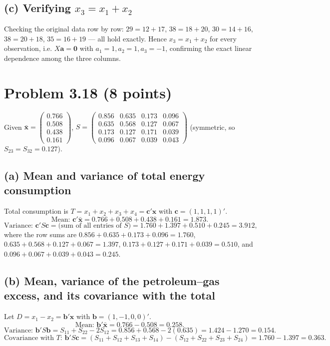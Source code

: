 \documentclass[11pt]{article}
\begin{document}
\subsection*{(c) Verifying $x_3=x_1+x_2$}
Checking the original data row by row: $29=12+17$, $38=18+20$, $30=14+16$, $38=20+18$, $35=16+19$ — all hold exactly. Hence $x_3=x_1+x_2$ for every observation, i.e. $X\bm a=\bm 0$ with $a_1=1,a_2=1,a_3=-1$, confirming the exact linear dependence among the three columns.

\newpage
\section*{Problem 3.18 (8 points)}

\noindent Given $\bar{\bm x}=\begin{pmatrix}0.766\\0.508\\0.438\\0.161\end{pmatrix}$, $S=\begin{pmatrix}0.856 & 0.635 & 0.173 & 0.096\\ 0.635 & 0.568 & 0.127 & 0.067\\ 0.173 & 0.127 & 0.171 & 0.039\\ 0.096 & 0.067 & 0.039 & 0.043\end{pmatrix}$ (symmetric, so $S_{23}=S_{32}=0.127$).

\subsection*{(a) Mean and variance of total energy consumption}
Total consumption is $T=x_1+x_2+x_3+x_4=\bm c'\bm x$ with $\bm c=(1,1,1,1)'$.
\[
\text{Mean: } \bm c'\bar{\bm x}=0.766+0.508+0.438+0.161=1.873.
\]
\[
\text{Variance: } \bm c'S\bm c=\text{(sum of all entries of $S$)}=1.760+1.397+0.510+0.245=3.912,
\]
where the row sums are $0.856+0.635+0.173+0.096=1.760$, $0.635+0.568+0.127+0.067=1.397$, $0.173+0.127+0.171+0.039=0.510$, and $0.096+0.067+0.039+0.043=0.245$.

\subsection*{(b) Mean, variance of the petroleum--gas excess, and its covariance with the total}
Let $D=x_1-x_2=\bm b'\bm x$ with $\bm b=(1,-1,0,0)'$.
\[
\text{Mean: } \bm b'\bar{\bm x}=0.766-0.508=0.258.
\]
\[
\text{Variance: } \bm b'S\bm b=S_{11}+S_{22}-2S_{12}=0.856+0.568-2(0.635)=1.424-1.270=0.154.
\]
\[
\text{Covariance with $T$: } \bm b'S\bm c=(S_{11}+S_{12}+S_{13}+S_{14})-(S_{12}+S_{22}+S_{23}+S_{24})=1.760-1.397=0.363.
\]
\end{document}
